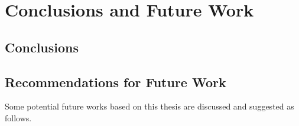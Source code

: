 \chapter{Conclusions and Future Work}
\label{chap:seven}
\section{Conclusions}


\section{Recommendations for Future Work}
Some potential future works based on this thesis are discussed and suggested as follows.\par